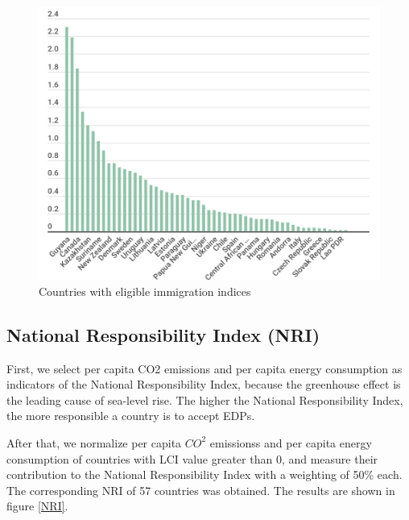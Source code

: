 \documentclass[12pt]{article}  %
\begin{document}
\begin{figure}[htbp]
	\centering
	\includegraphics[width=.8\textwidth]{LCI.png}
	\caption{ Countries with eligible immigration indices }\label{Countries_with_eligible_immigration_indices}
\end{figure}





\subsection{National Responsibility Index (NRI)}
First, we select per capita CO2 emissions and per capita energy consumption as indicators of the National Responsibility Index, because the greenhouse effect is the leading cause of sea-level rise. The higher the National Responsibility Index, the more responsible a country is to accept EDPs.


After that, we normalize per capita $CO^2$ emissionss and per capita energy consumption of countries with LCI value greater than 0, and measure their contribution to the National Responsibility Index with a weighting of 50\% each. The corresponding NRI of 57 countries was obtained. The results are shown in figure \ref{NRI}.
\end{document}
